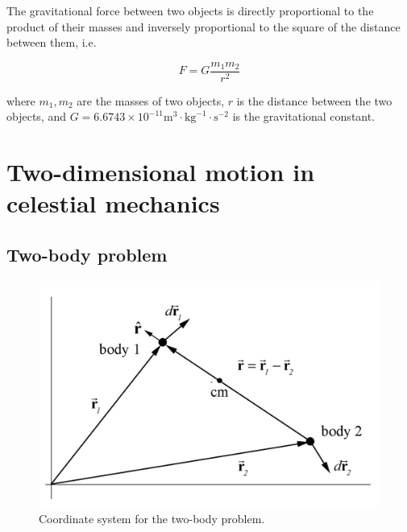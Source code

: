 \begin{frame}{\subsecname}
The gravitational force between two objects is directly proportional to the product of their masses and inversely proportional to the square of the distance between them, i.e.

\begin{equation}
F = G\frac{m_1m_2}{r^2}
\end{equation}

where \(m_1, m_2\) are the masses of two objects, \(r\) is the distance between the two objects, and \(G = 6.6743 \times 10^{-11} \text{m}^3 \cdot \text{kg}^{-1} \cdot \text{s}^{-2}\) is the gravitational constant.

\end{frame}

\section[Celestial mechanics]{Two-dimensional motion in celestial mechanics}


\subsection{Two-body problem}

\begin{frame}{\subsecname}

\begin{figure}
    \centering
    \includegraphics[height = 0.8\textheight]{assets/twobody.png}
    \caption{Coordinate system for the two-body problem.}
    \label{fig:my_label}
\end{figure}
\end{frame}

